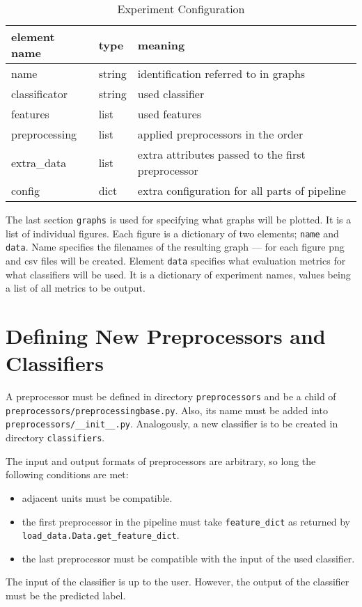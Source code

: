 \begin{table}[h!]

\centering
\begin{tabular}{lll}
\toprule
\textbf{element name} & \textbf{type} & \textbf{meaning}\\
\midrule
name 			& string	& identification referred to in graphs\\
classificator 	& string	& used classifier\\
features 		& list		& used features \\
preprocessing 	& list		& applied preprocessors in the order\\
extra\_data 	& list 		& extra attributes passed to the first preprocessor \\
config			& dict		& extra configuration for all parts of pipeline \\
\bottomrule
\end{tabular}

\caption{Experiment Configuration}\label{tab:exp_dict}
\end{table}


The last section \texttt{graphs} is used for specifying what graphs will be plotted.
It is a list of individual figures.
Each figure is a dictionary of two elements; \texttt{name} and \texttt{data}.
Name specifies the filenames of the resulting graph ---
for each figure png and csv files will be created.
Element \texttt{data} specifies what evaluation metrics for what classifiers will be used.
It is a dictionary of experiment names, values being a list of all metrics to be output.


\section{Defining New Preprocessors and Classifiers}

A preprocessor must be defined in directory \texttt{preprocessors} and be a child of \texttt{preprocessors/preprocessingbase.py}.
Also, its name must be added into \texttt{preprocessors/\_\_init\_\_.py}.
Analogously, a new classifier is to be created in directory \texttt{classifiers}.

The input and output formats of preprocessors are arbitrary, so long the following conditions are met:

\begin{itemize}
	\item  adjacent units must be compatible.
	\item the first preprocessor in the pipeline must take \texttt{feature\_dict} as returned by \texttt{load\_data.Data.get\_feature\_dict}.
	\item the last preprocessor must be compatible with the input of the used classifier.
\end{itemize}

The input of the classifier is up to the user.
However, the output of the classifier must be the predicted label.

